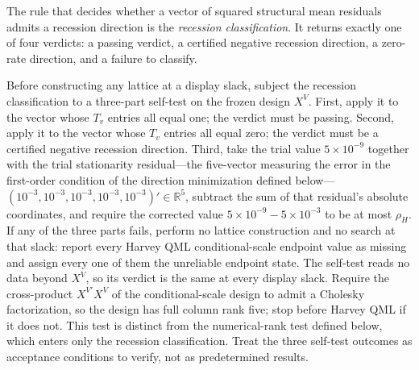 \documentclass[11pt]{article}
\begin{document}
The rule that decides whether a vector of squared structural mean residuals admits a recession
direction is the \emph{recession classification}. It returns exactly one of four verdicts: a passing verdict,
a certified negative recession direction, a zero-rate direction, and a failure to classify.

Before constructing any lattice at a display slack, subject the recession classification to a
three-part self-test on the frozen design \(X^V\). First, apply it to the vector whose \(T_v\)
entries all equal one; the verdict must be passing. Second, apply it to the vector whose \(T_v\)
entries all equal zero; the verdict must be a certified negative recession direction. Third, take
the trial value \(5\times10^{-9}\) together with the trial stationarity residual---the five-vector
measuring the error in the first-order condition of the direction minimization defined below---\((10^{-3},10^{-3},10^{-3},10^{-3},10^{-3})'\in\mathbb
R^5\), subtract the sum of that residual's absolute coordinates, and require the corrected value
\(5\times10^{-9}-5\times10^{-3}\) to be at most \(\rho_H\). If any of the three parts fails, perform no lattice construction and no search at
that slack: report every Harvey QML conditional-scale endpoint value as missing and assign every one
of them the unreliable endpoint state. The self-test reads no data beyond \(X^V\), so its verdict is
the same at every display slack. Require the cross-product \(X^{V\prime}X^V\) of the
conditional-scale design to admit a Cholesky factorization, so the design has full column rank five;
stop before Harvey QML if it does not. This test is distinct from the numerical-rank test defined
below, which enters only the recession classification. Treat the three self-test outcomes as
acceptance conditions to verify, not as predetermined results.
\end{document}
